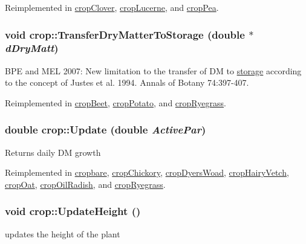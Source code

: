 Reimplemented in \hyperlink{classcrop_clover_a1440530239e8b4754faefd889e56c83a}{cropClover}, \hyperlink{classcrop_lucerne_a6c87366e1282653cb964ca4c96ab8731}{cropLucerne}, and \hyperlink{classcrop_pea_acd369e049225726674bcc0091f2f9e54}{cropPea}.\hypertarget{classcrop_aa93103e69836afc4fb23c1a29b15584f}{
\subsubsection[{TransferDryMatterToStorage}]{\setlength{\rightskip}{0pt plus 5cm}void crop::TransferDryMatterToStorage (double $\ast$ {\em dDryMatt})}}
\label{classcrop_aa93103e69836afc4fb23c1a29b15584f}
BPE and MEL 2007: New limitation to the transfer of DM to \hyperlink{classstorage}{storage} according to the concept of Justes et al. 1994. Annals of Botany 74:397-\/407. 

Reimplemented in \hyperlink{classcrop_beet_a6082dfaca5fc7cae98ec3fd5208d1380}{cropBeet}, \hyperlink{classcrop_potato_a6fcc63dfefbe4d6c6753c6ba0d71ea8f}{cropPotato}, and \hyperlink{classcrop_ryegrass_a41ff7bdc52b0466a4598e104b4723572}{cropRyegrass}.\hypertarget{classcrop_a9ed02462e332fffb65498075e7499bf4}{
\subsubsection[{Update}]{\setlength{\rightskip}{0pt plus 5cm}double crop::Update (double {\em ActivePar})}}
\label{classcrop_a9ed02462e332fffb65498075e7499bf4}
Returns daily DM growth 

Reimplemented in \hyperlink{classcropbare_a141cff2a17ccfb22637dd0692a427795}{cropbare}, \hyperlink{classcrop_chickory_adef10cd7666f588810ba6d71c581e289}{cropChickory}, \hyperlink{classcrop_dyers_woad_ac99e68efb5b08aa2e0208b5e925929a8}{cropDyersWoad}, \hyperlink{classcrop_hairy_vetch_a4a1d386caee18a4ae111c5b8a1448d48}{cropHairyVetch}, \hyperlink{classcrop_oat_ae7850c3901966142a6ada63470313e5a}{cropOat}, \hyperlink{classcrop_oil_radish_aa699ab0f332d4a9eba58255b99fe2ea2}{cropOilRadish}, and \hyperlink{classcrop_ryegrass_a6785773151146d1e49ec5bb5c75636aa}{cropRyegrass}.\hypertarget{classcrop_aeccf3077c6ad647769145b8064ba426b}{
\subsubsection[{UpdateHeight}]{\setlength{\rightskip}{0pt plus 5cm}void crop::UpdateHeight ()}}
\label{classcrop_aeccf3077c6ad647769145b8064ba426b}
updates the height of the plant 

